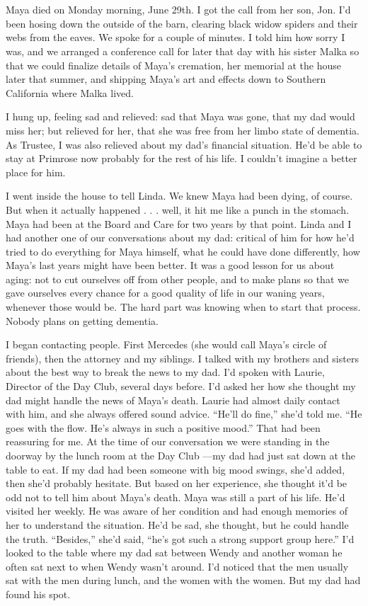 \documentclass[12pt]{book}
\begin{document}
\chapter{}

Maya died on Monday morning, June 29th. I got the call from her son, Jon. I'd been hosing down the outside of the barn, clearing black widow spiders and their webs from the eaves. We spoke for a couple of minutes. I told him how sorry I was, and we arranged a conference call for later that day with his sister Malka so that we could finalize details of Maya's cremation, her memorial at the house later that summer, and shipping Maya's art and effects down to Southern California where Malka lived.

I hung up, feeling sad and relieved: sad that Maya was gone, that my dad would miss her; but relieved for her, that she was free from her limbo state of dementia. As Trustee, I was also relieved about my dad's financial situation. He'd be able to stay at Primrose now probably for the rest of his life. I couldn't imagine a better place for him.

I went inside the house to tell Linda. We knew Maya had been dying, of course. But when it actually happened . . . well, it hit me like a punch in the stomach. Maya had been at the Board and Care for two years by that point. Linda and I had another one of our conversations about my dad: critical of him for how he'd tried to do everything for Maya himself, what he could have done differently, how Maya's last years might have been better. It was a good lesson for us about aging: not to cut ourselves off from other people, and to make plans so that we gave ourselves every chance for a good quality of life in our waning years, whenever those would be. The hard part was knowing when to start that process. Nobody plans on getting dementia.

I began contacting people. First Mercedes (she would call Maya's circle of friends), then the attorney and my siblings. I talked with my brothers and sisters about the best way to break the news to my dad. I'd spoken with Laurie, Director of the Day Club, several days before. I'd asked her how she thought my dad might handle the news of Maya's death. Laurie had almost daily contact with him, and she always offered sound advice. ``He'll do fine,'' she'd told me. ``He goes with the flow. He's always in such a positive mood.'' That had been reassuring for me. At the time of our conversation we were standing in the doorway by the lunch room at the Day Club ---my dad had just sat down at the table to eat. If my dad had been someone with big mood swings, she'd added, then she'd probably hesitate. But based on her experience, she thought it'd be odd not to tell him about Maya's death. Maya was still a part of his life. He'd visited her weekly. He was aware of her condition and had enough memories of her to understand the situation. He'd be sad, she thought, but he could handle the truth. ``Besides,'' she'd said, ``he's got such a strong support group here.'' I'd looked to the table where my dad sat between Wendy and another woman he often sat next to when Wendy wasn't around. I'd noticed that the men usually sat with the men during lunch, and the women with the women. But my dad had found his spot.
\end{document}
